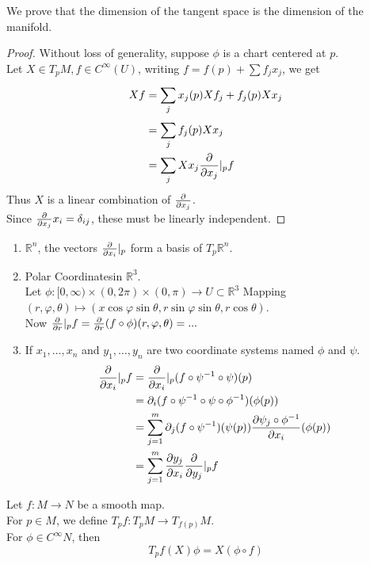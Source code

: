 \documentclass[../main.tex]{subfiles}
\begin{document}
We prove that the dimension of the tangent space is the dimension of the manifold.
\begin{proof}
Without loss of generality, suppose $\phi$ is a chart centered at $p$.\\
Let $X\in T_p M, f \in C^{ \infty }( U) $, writing $f= f( p) + \sum f_j x_j$, we get
\begin{align*}
	Xf &= \sum_{j}^{ } x_j( p) Xf_j + f_j ( p) X x_j\\
&= \sum_{j}^{ } f_j( p) Xx_j\\
&= \sum_{j}^{ } Xx_j \frac{\partial}{\partial x_j}|_p f
\end{align*}
Thus $X$ is a linear combination of $ \frac{\partial}{\partial x_j}$.\\
Since $ \frac{\partial}{\partial x_j} x_i = \delta_{ij} $, these must be linearly independent.
\end{proof}
\begin{exemple}
\begin{enumerate}
\item $ \mathbb{R}^n$, the vectors $ \frac{\partial}{\partial x_i}|_p$ form a basis of $T_p \mathbb{R}^n$.
\item Polar Coordinatesin $ \mathbb{R}^{3}$.\\
	Let $\phi: [ 0, \infty ) \times ( 0,2\pi)\times ( 0, \pi)  \to U \subset \mathbb{R}^{3} $ 
	Mapping $( r,\varphi,\theta)\mapsto ( x \cos\varphi\sin \theta,r\sin\varphi\sin\theta,r \cos\theta)  $.\\
	Now $ \frac{\partial}{\partial r} |_p f = \frac{\partial}{\partial r} ( f\circ\phi) ( r,\varphi,\theta) = ...$ 
\item If $x_1,\ldots,x_n$ and $y_1,\ldots, y_n$ are two coordinate systems named $\phi$ and $\psi$.
	\begin{align*}
	\frac{\partial}{\partial x_i}|_p f  &= \frac{\partial}{\partial x_i}|_p ( f\circ\psi^{-1}\circ\psi) ( p) \\
	&= \partial_i ( f\circ\psi^{-1}\circ\psi\circ\phi^{-1}) ( \phi( p) ) \\
	&= \sum_{j=1}^{ m} \partial_j ( f\circ\psi^{-1}) ( \psi( p) )  \frac{\partial \psi_j\circ \phi^{-1}}{\partial x_i}( \phi( p) ) \\
	&= \sum_{j=1}^{ m} \frac{\partial y_j}{\partial x_i} \frac{\partial}{\partial y_j}|_p f
	\end{align*}
	
\end{enumerate}
\end{exemple}
\begin{defn}
	Let $f:M\to N$ be a smooth map.\\
	For $p\in M$, we define $T_p f: T_p M\to T_{f( p) } M$.\\
	For $\phi\in C^{ \infty }N$, then
	\[ 
	T_p f ( X) \phi = X( \phi\circ f) 
	\]
\end{defn}
\end{document}
